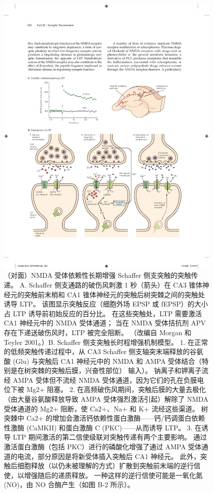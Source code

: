 \begin{figure}[htbp]
	\centering
	\includegraphics[width=0.85\linewidth]{chap13/fig_13_10}
	\caption{（对面）NMDA 受体依赖性长期增强 Schaffer 侧支突触的突触传递。 A. Schaffer 侧支通路的破伤风刺激 1 秒（箭头）在 CA3 锥体神经元的突触前末梢和 CA1 锥体神经元的突触后树突棘之间的突触处诱导 LTP。 该图显示突触反应（细胞外场 EPSP 或 fEPSP）的大小占 LTP 诱导前初始反应的百分比。 在这些突触处，LTP 需要激活 CA1 神经元中的 NMDA 受体通道； 当在 NMDA 受体拮抗剂 APV 存在下递送破伤风时，LTP 被完全阻断。 （改编自 Morgan 和 Teyler 2001。）B. Schaffer 侧支突触长时程增强机制模型。 1. 在正常的低频突触传递过程中，从 CA3 Schaffer 侧支轴突末端释放的谷氨酸 (Glu) 与突触后 CA1 神经元中的 NMDA 和 AMPA 受体结合（特别是在树突棘的突触后膜，兴奋性部位） 输入）。 钠离子和钾离子流经 AMPA 受体但不流经 NMDA 受体通道，因为它们的孔在负膜电位下被 Mg2+ 阻塞。 2. 在高频破伤风期间，突触后膜的大量去极化（由大量谷氨酸释放导致 AMPA 受体强烈激活引起）解除了 NMDA 受体通道的 Mg2+ 阻断，使 Ca2+、Na+ 和 K+ 流经这些渠道。 树突棘中 Ca2+ 的增加会激活钙依赖性蛋白激酶——钙/钙调蛋白依赖性激酶 (CaMKII) 和蛋白激酶 C (PKC)——从而诱导 LTP。 3. 在诱导 LTP 期间激活的第二信使级联对突触传递有两个主要影响。 通过激活蛋白激酶（包括 PKC）进行的磷酸化增强了通过 AMPA 受体通道的电流，部分原因是将新受体插入突触后 CA1 神经元。 此外，突触后细胞释放（以仍未被理解的方式）扩散到突触前末端的逆行信使，以增强随后的递质释放。 一种这样的逆行信使可能是一氧化氮 (NO)，由 NO 合酶产生（如图 B-2 所示）。}
	\label{fig:13_10}
\end{figure}


